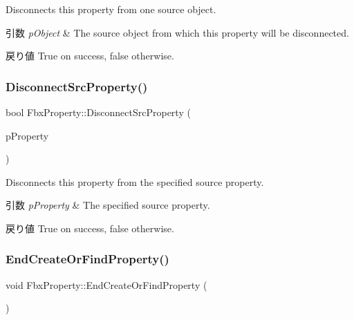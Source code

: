 Disconnects this property from one source object. 
\begin{DoxyParams}{引数}
{\em p\+Object} & The source object from which this property will be disconnected. \\
\hline
\end{DoxyParams}
\begin{DoxyReturn}{戻り値}
{\ttfamily True} on success, {\ttfamily false} otherwise. 
\end{DoxyReturn}
\mbox{\label{class_fbx_property_a25e6a00df6d1ec69db93a1d31c38374b}} 
\subsubsection{\texorpdfstring{Disconnect\+Src\+Property()}{DisconnectSrcProperty()}}
{\footnotesize\ttfamily bool Fbx\+Property\+::\+Disconnect\+Src\+Property (\begin{DoxyParamCaption}\item[{const \hyperlink{class_fbx_property}{Fbx\+Property} \&}]{p\+Property }\end{DoxyParamCaption})}

Disconnects this property from the specified source property. 
\begin{DoxyParams}{引数}
{\em p\+Property} & The specified source property. \\
\hline
\end{DoxyParams}
\begin{DoxyReturn}{戻り値}
{\ttfamily True} on success, {\ttfamily false} otherwise. 
\end{DoxyReturn}
\mbox{\label{class_fbx_property_a1af85e75268d31cb28323895ad45d52c}} 
\subsubsection{\texorpdfstring{End\+Create\+Or\+Find\+Property()}{EndCreateOrFindProperty()}}
{\footnotesize\ttfamily void Fbx\+Property\+::\+End\+Create\+Or\+Find\+Property (\begin{DoxyParamCaption}{ }\end{DoxyParamCaption})\hspace{0.3cm}{\ttfamily [inline]}}



